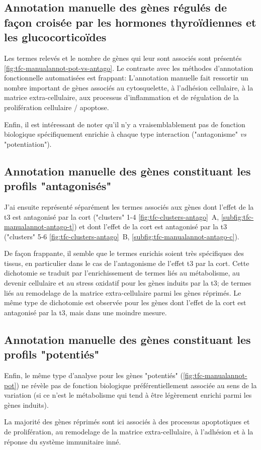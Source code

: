 \documentclass[../main.tex]{subfiles}
\begin{document}
\subsection{Annotation manuelle des gènes régulés de façon croisée par les hormones thyroïdiennes et les glucocorticoïdes}
Les termes relevés et le nombre de gènes qui leur sont associés sont présentés \autoref{fig:tfc-manualannot-pot-vs-antago}.
Le contraste avec les méthodes d'annotation fonctionnelle automatisées est frappant:
L'annotation manuelle fait ressortir un nombre important de gènes associés au cytosquelette, à l'adhésion cellulaire, à la matrice extra-cellulaire, aux processus d'inflammation et de régulation de la prolifération cellulaire / apoptose.



Enfin, il est intéressant de noter qu'il n'y a vraisemblablement pas de fonction biologique spécifiquement enrichie à chaque type interaction ("antagonisme" \textit{vs} "potentiation").


\subsection{Annotation manuelle des gènes constituant les profils "antagonisés"}
J'ai ensuite représenté séparément les termes associés aux gènes dont l'effet de la \gls{t3} est antagonisé par la \gls{cort} ("clusters" 1-4 \autoref{fig:tfc-clusters-antago}~A, \autoref{subfig:tfc-manualannot-antago-t}) et dont l'effet de la \gls{cort} est antagonisé par la \gls{t3} ("clusters" 5-6 \autoref{fig:tfc-clusters-antago}~B, \autoref{subfig:tfc-manualannot-antago-c}).



De façon frappante, il semble que le termes enrichis soient très spécifiques des tissus, en particulier dans le cas de l'antagonisme de l'effet \gls{t3}
par la \gls{cort}.
Cette dichotomie se traduit par l'enrichissement de termes liés au métabolisme, au devenir cellulaire et au stress oxidatif pour les gènes induits par la \gls{t3}; de termes liés au remodelage de la matrice extra-cellulaire parmi les gènes réprimés.
Le même type de dichotomie est observée pour les gènes dont l'effet de la \gls{cort} est antagonisé par la \gls{t3}, mais dans une moindre mesure.


\subsection{Annotation manuelle des gènes constituant les profils "potentiés"}
Enfin, le même type d'analyse pour les gènes "potentiés" (\autoref{fig:tfc-manualannot-pot}) ne révèle pas de fonction biologique préférentiellement associée au sens de la variation (si ce n'est le métabolisme qui tend à être légèrement enrichi parmi les gènes induits).



La majorité des gènes réprimés sont ici associés à des processus apoptotiques et de prolifération, au remodelage de la matrice extra-cellulaire, à l'adhésion et à la réponse du système immunitaire inné.
\end{document}
